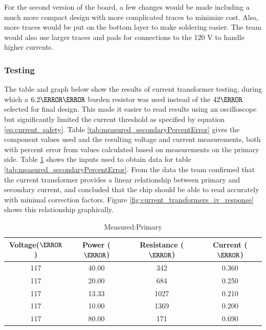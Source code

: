 For the second version of the board, a few changes would be made including a much more compact design with more complicated traces to minimize cost. Also, more traces would be put on the bottom layer to make soldering easier. The team would also use larger traces and pads for connections to the 120 V to handle higher currents. 

\subsubsection{Testing}
The table and graph below show the results of current transformer testing, during which a $6.2\kilo\ohm$ burden resistor was used instead of the $42 \ohm$ selected for final design. This made it easier to read results using an oscilloscope but significantly limited the current threshold as specified by equation \ref{eq:current_safety}. Table \ref{tab:measured_secondaryPercentError} gives the component values used and the resulting voltage and current measurements, both with percent error from values calculated based on measurements on the primary side. Table \ref{tab:measured_primary} shows the inputs used to obtain data for table \ref{tab:measured_secondaryPercentError}. From the data the team confirmed that the current transformer provides a linear relationship between primary and secondary current, and concluded that the chip should be able to read accurately with minimal correction factors. Figure \ref{fig:current_transformers_iv_response} shows this relationship graphically.

\begin{table}[htdp]
\caption{Measured:Primary}
\begin{center}
\begin{tabular}{|c|c|c|c|} \hline
Voltage($\volt$) & Power ($\watt$) & Resistance ($\ohm$) & Current ($\ampere$) \\ \hline
117 & 40.00 & 342 & 0.360 \\ \hline
117 & 20.00 & 684 & 0.250 \\ \hline
117 & 13.33 & 1027 & 0.210 \\ \hline
117 & 10.00 & 1369 & 0.200 \\ \hline
117 & 80.00 & 171 & 0.690 \\ \hline
\end{tabular}
\end{center}
\label{tab:measured_primary}
\end{table}%

